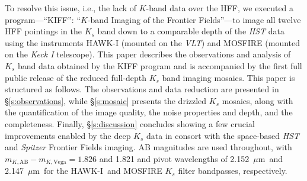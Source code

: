 \documentclass[preprint2]{aastex6}
\gdef\mum{$\mu\mathrm{m}$}
\gdef\HAWKI{\mbox{HAWK-I}}
\begin{document}
To resolve this issue, i.e., the lack of $K$-band data over the HFF, we executed a program---``KIFF'': ``$K$-band Imaging of the Frontier Fields''---to image all twelve HFF pointings in the $K_s$ band down to a comparable depth of the {\it HST} data using the instruments HAWK-I (mounted on the {\it VLT}) and MOSFIRE (mounted on the {\it Keck I} telescope). This paper describes the observations and analysis of $K_s$ band data obtained by the KIFF program and is accompanied by the first full public release of the reduced full-depth $K_s$ band imaging mosaics. This paper is structured as follows. The observations and data reduction are presented in \S\ref{s:observations}, while \S\ref{s:mosaic} presents the drizzled $K_s$ mosaics, along with the quantification of the image quality, the noise properties and depth, and the completeness. Finally, \S\ref{s:discussion} concludes showing a few crucial improvements enabled by the deep $K_s$ data in consort with the space-based \textit{HST} and \textit{Spitzer} Frontier Fields imaging.  AB magnitudes are used throughout, with $m_{K, \mathrm{AB}} - m_{K, \mathrm{Vega}} = 1.826$ and 1.821 and pivot wavelengths \citep{tokunaga:05} of 2.152~\mum\ and 2.147~\mum\ for the \HAWKI\ and MOSFIRE $K_s$ filter bandpasses, respectively. 


\end{document}
